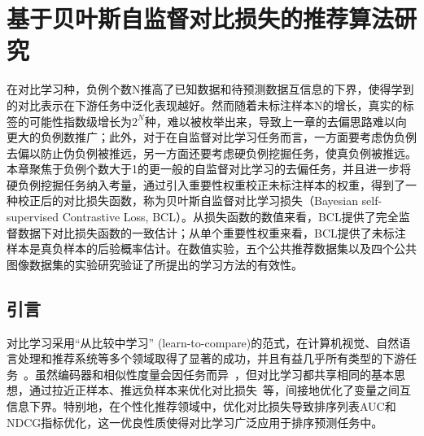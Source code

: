 \chapter{基于贝叶斯自监督对比损失的推荐算法研究}
\label{cha:fifthsection}



\label{sec:parameters}
在对比学习种，负例个数N推高了已知数据和待预测数据互信息的下界，使得学到的对比表示在下游任务中泛化表现越好\cite{Oord:2018:arxiv,Chuang:2020:NIPS,Robinson:2021:ICLR}。然而随着未标注样本N的增长，真实的标签的可能性指数级增长为$2^N$种，难以被枚举出来，导致上一章的去偏思路难以向更大的负例数推广；此外，对于在自监督对比学习任务而言，一方面要考虑伪负例去偏以防止伪负例被推远，另一方面还要考虑硬负例挖掘任务，使真负例被推远。本章聚焦于负例个数大于1的更一般的自监督对比学习的去偏任务，并且进一步将硬负例挖掘任务纳入考量，通过引入重要性权重校正未标注样本的权重，得到了一种校正后的对比损失函数，称为贝叶斯自监督对比学习损失（Bayesian self-supervised Contrastive Loss, BCL）。从损失函数的数值来看，BCL提供了完全监督数据下对比损失函数的一致估计；从单个重要性权重来看，BCL提供了未标注样本是真负样本的后验概率估计。在数值实验，五个公共推荐数据集以及四个公共图像数据集的实验研究验证了所提出的学习方法的有效性。

\section{引言}
对比学习采用“从比较中学习” (learn-to-compare)\cite{Gutmann:2010:ICAIS}的范式，在计算机视觉、自然语言处理和推荐系统等多个领域取得了显著的成功，并且有益几乎所有类型的下游任务~\cite{Liu:2021:TKDE,Bachman:2019:NIPS,chen2020improved,Huang:2019:ICML,Wu:2018:CVPR,Zhuang:2019:CVPR}。虽然编码器和相似性度量会因任务而异~\cite{Devlin:2018:bert,He:2020:CVPR,Dosovitskiy:2014:NIPS}，但对比学习都共享相同的基本思想，通过拉近正样本、推远负样本来优化对比损失~\cite{Wang:2020:ICML,Gutmann:2010:ICAIS,Oord:2018:arxiv,Hjelm:2018:Arxiv,Wang:2020:ICML}等，间接地优化了变量之间互信息下界\cite{Oord:2018:arxiv}。特别地，在个性化推荐领域中，优化对比损失导致排序列表AUC和NDCG指标优化\cite{Steffen:2009:UAI,Jiancan:2022:arxiv}，这一优良性质使得对比学习广泛应用于排序预测任务中。

